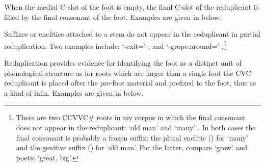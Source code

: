 When the medial C-slot of the foot is empty,
the final C-slot of the reduplicant is filled by
the final consonant of the foot.
Examples are given in  below.

\begin{exe}
	\label{ex:ParRedEmpMedCSlo}
\end{exe}

Suffixes or enclitics attached to a stem do not appear in the reduplicant in partial reduplication.
Two examples include:  `{\n}-exit={\einV}' {\ra} ,
and  `{\na}-grope.around={\einV}' {\ra} .\footnote{
		There are two CCVVC{\#} roots in my corpus in which the final consonant does
		not appear in the reduplicant:
		 `old man' {\ra} 
		and  `many' {\ra} .
		In both cases the final consonant is probably a frozen suffix:
		the plural enclitic   () for  `many'
		and the genitive suffix  () for  `old man'.
		For the latter, compare  `grow' and poetic  `great, big'.}

Reduplication provides evidence for identifying
the foot as a distinct unit of phonological structure
as for roots which are larger than a single foot
the CVC reduplicant is placed after the
pre-foot material and prefixed to the foot,
thus as a kind of infix.
Examples are given in  below.

